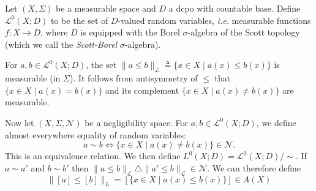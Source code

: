 \documentclass{lmcs}
\newcommand{\Ell}{\mathcal{L}}
\newcommand{\En}{\mathcal{N}}
\newcommand{\defeq}{\mathrel{\triangleq}}
\newcommand{\bvs}[1]{\| {#1} \|}
\newcommand{\symdiff}{\mathbin{\triangle}}
\begin{document}
\begin{defi}
\label{RandVarDef}
Let $(X,\Sigma)$ be a measurable space and $D$ a dcpo with countable base. Define $\Ell^0(X;D)$ to be the set of $D$-valued random variables, \emph{i.e.} measurable functions $f : X \rightarrow D$, where $D$ is equipped with the Borel $\sigma$-algebra of the Scott topology (which we call the \emph{Scott-Borel} $\sigma$-algebra). 

For $a,b \in \Ell^0(X;D)$, the set $\bvs{a \leq b}_\Ell \defeq \{ x \in X \mid a(x) \leq b(x) \}$ is measurable (in $\Sigma$). It follows from antisymmetry of $\leq$ that $\{ x \in X \mid a(x) = b(x) \}$ and its complement $\{ x \in X \mid a(x) \neq b(x) \}$ are measurable. 

Now let $(X,\Sigma,\En)$ be a negligibility space. For $a,b \in \Ell^0(X;D)$, we define almost everywhere equality of random variables:
\[
a \sim b \Leftrightarrow \{ x \in X \mid a(x) \neq b(x) \} \in \En.
\]
This is an equivalence relation. We then define $L^0(X;D) = \Ell^0(X;D)/{\sim}$. 
If $a \sim a'$ and $b \sim b'$ then $\bvs{a \leq b}_\Ell \symdiff \bvs{a' \leq b}_\Ell \in \En$. We can therefore define 
\[
\bvs{[a] \leq [b]}_L = [\{ x \in X \mid a(x) \leq b(x) \}] \in A(X)
\]
\end{defi}
\end{document}
